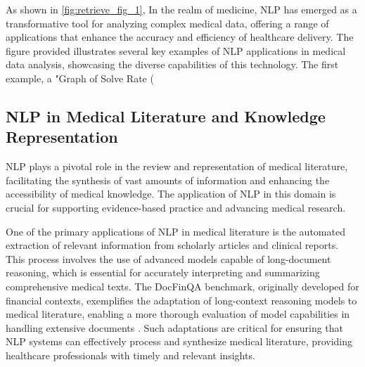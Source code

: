 As shown in \autoref{fig:retrieve_fig_1}, In the realm of medicine, NLP has emerged as a transformative tool for analyzing complex medical data, offering a range of applications that enhance the accuracy and efficiency of healthcare delivery. The figure provided illustrates several key examples of NLP applications in medical data analysis, showcasing the diverse capabilities of this technology. The first example, a "Graph of Solve Rate (%
\subsection{NLP in Medical Literature and Knowledge Representation} \label{subsec:NLP in Medical Literature and Knowledge Representation}



NLP plays a pivotal role in the review and representation of medical literature, facilitating the synthesis of vast amounts of information and enhancing the accessibility of medical knowledge. The application of NLP in this domain is crucial for supporting evidence-based practice and advancing medical research.



One of the primary applications of NLP in medical literature is the automated extraction of relevant information from scholarly articles and clinical reports. This process involves the use of advanced models capable of long-document reasoning, which is essential for accurately interpreting and summarizing comprehensive medical texts. The DocFinQA benchmark, originally developed for financial contexts, exemplifies the adaptation of long-context reasoning models to medical literature, enabling a more thorough evaluation of model capabilities in handling extensive documents \cite{reddy2024docfinqalongcontextfinancialreasoning}. Such adaptations are critical for ensuring that NLP systems can effectively process and synthesize medical literature, providing healthcare professionals with timely and relevant insights.




